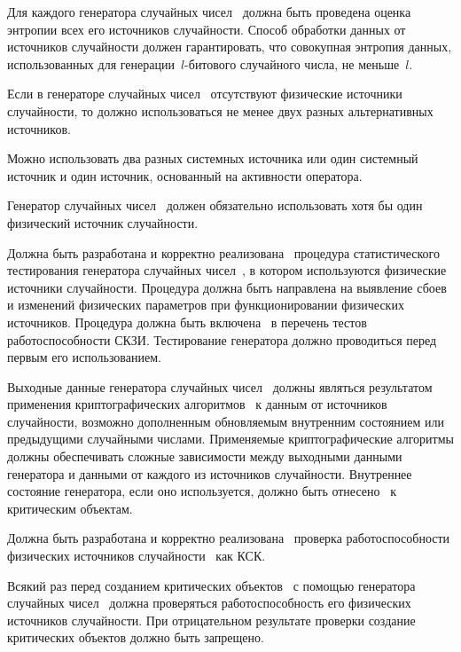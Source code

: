 \label{R.RN.Entropy} %
Для каждого генератора случайных чисел~ должна быть проведена
оценка энтропии всех его источников случайности.
%
Способ обработки данных от источников случайности должен гарантировать, что
совокупная энтропия данных, использованных для генерации~$l$-битового случайного
числа,\addendum{~---} не меньше~$l$.

\label{R.RN.Source1} %
Если в генераторе случайных чисел~ отсутствуют физические
источники случайности, то должно использоваться не менее двух разных
альтернативных источников.

\begin{note*}
Можно использовать два разных системных источника или один системный источник и
один источник, основанный на активности оператора.
\end{note*}

\label{R.RN.Source2} %
Генератор случайных чисел~ должен обязательно использовать
хотя бы один физический источник случайности.

\label{R.RN.Tests} %
Должна быть разработана и корректно
реализована~ процедура статистического
тестирования генератора случайных чисел~, в котором
используются физические источники случайности.
%
Процедура должна быть направлена на выявление сбоев и изменений физических
параметров при функционировании физических источников.
%
Процедура должна быть включена~ в перечень тестов 
работоспособности СКЗИ. Тестирование генератора должно проводиться перед 
первым его использованием. 

\label{R.RN.Crypto} %
Выходные данные генератора случайных чисел~
должны являться результатом применения криптографических алгоритмов~ 
к данным от источников случайности, возможно дополненным обновляемым внутренним 
состоянием или предыдущими случайными числами.
%
Применяемые криптографические алгоритмы должны обеспечивать сложные зависимости
между выходными данными генератора и данными от каждого из источников
случайности.
%
Внутреннее состояние генератора, если оно используется, должно быть
отнесено~ к критическим объектам.

\label{R.RN.TotTest} %
Должна быть разработана и корректно
реализована~ проверка работоспособности
физических источников случайности~ как КСК.

\label{R.RN.GenCrit} %
Всякий раз перед созданием критических объектов~ с помощью
генератора случайных чисел~ должна проверяться
работоспособность его физических источников случайности.
%
При отрицательном результате проверки создание критических объектов должно быть
запрещено.
